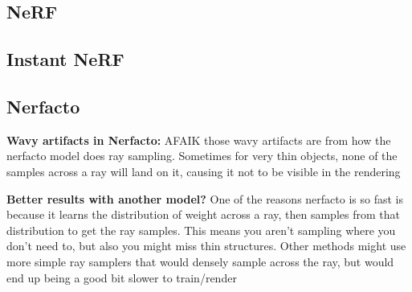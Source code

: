 \subsection{NeRF}

\subsection{Instant NeRF}

\subsection{Nerfacto}

\textbf{Wavy artifacts in Nerfacto:}
AFAIK those wavy artifacts are from how the nerfacto model does ray sampling. Sometimes for very thin objects, none of the samples across a ray will land on it, causing it not to be visible in the rendering 

\textbf{Better results with another model?}
One of the reasons nerfacto is so fast is because it learns the distribution of weight across a ray, then samples from that distribution to get the ray samples. This means you aren't sampling where you don't need to, but also you might miss thin structures. Other methods might use more simple ray samplers that would densely sample across the ray, but would end up being a good bit slower to train/render
